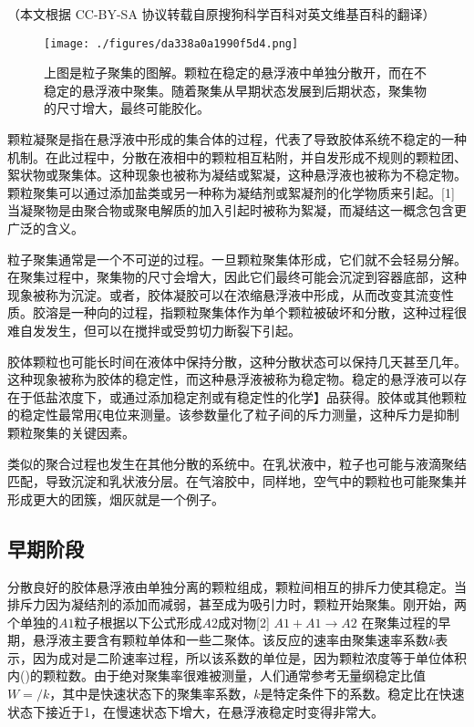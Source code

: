 
（本文根据 CC-BY-SA 协议转载自原搜狗科学百科对英文维基百科的翻译）
\begin{figure}[ht]
\centering
\texttt{[image: ./figures/da338a0a1990f5d4.png]}
\caption{上图是粒子聚集的图解。颗粒在稳定的悬浮液中单独分散开，而在不稳定的悬浮液中聚集。随着聚集从早期状态发展到后期状态，聚集物的尺寸增大，最终可能胶化。} \label{fig_LZJH_3}
\end{figure}

颗粒凝聚是指在悬浮液中形成的集合体的过程，代表了导致胶体系统不稳定的一种机制。在此过程中，分散在液相中的颗粒相互粘附，并自发形成不规则的颗粒团、絮状物或聚集体。这种现象也被称为凝结或絮凝，这种悬浮液也被称为不稳定物。颗粒聚集可以通过添加盐类或另一种称为凝结剂或絮凝剂的化学物质来引起。[1] 当凝聚物是由聚合物或聚电解质的加入引起时被称为絮凝，而凝结这一概念包含更广泛的含义。

粒子聚集通常是一个不可逆的过程。一旦颗粒聚集体形成，它们就不会轻易分解。在聚集过程中，聚集物的尺寸会增大，因此它们最终可能会沉淀到容器底部，这种现象被称为沉淀。或者，胶体凝胶可以在浓缩悬浮液中形成，从而改变其流变性质。胶溶是一种向的过程，指颗粒聚集体作为单个颗粒被破坏和分散，这种过程很难自发发生，但可以在搅拌或受剪切力断裂下引起。

胶体颗粒也可能长时间在液体中保持分散，这种分散状态可以保持几天甚至几年。这种现象被称为胶体的稳定性，而这种悬浮液被称为稳定物。稳定的悬浮液可以存在于低盐浓度下，或通过添加稳定剂或有稳定性的化学】品获得。胶体或其他颗粒的稳定性最常用ζ电位来测量。该参数量化了粒子间的斥力测量，这种斥力是抑制颗粒聚集的关键因素。

类似的聚合过程也发生在其他分散的系统中。在乳状液中，粒子也可能与液滴聚结匹配，导致沉淀和乳状液分层。在气溶胶中，同样地，空气中的颗粒也可能聚集并形成更大的团簇，烟灰就是一个例子。

\subsection{早期阶段}
分散良好的胶体悬浮液由单独分离的颗粒组成，颗粒间相互的排斥力使其稳定。当排斥力因为凝结剂的添加而减弱，甚至成为吸引力时，颗粒开始聚集。刚开始，两个单独的$A1$粒子根据以下公式形成$A2$成对物[2]
$A 1 + A 1 \to A 2$
在聚集过程的早期，悬浮液主要含有颗粒单体和一些二聚体。该反应的速率由聚集速率系数$k$表示，因为成对是二阶速率过程，所以该系数的单位是，因为颗粒浓度等于单位体积内()的颗粒数。由于绝对聚集率很难被测量，人们通常参考无量纲稳定比值$W = /k$，其中是快速状态下的聚集率系数，$k$是特定条件下的系数。稳定比在快速状态下接近于1，在慢速状态下增大，在悬浮液稳定时变得非常大。

